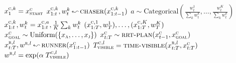 \documentclass{article}
\newcommand{\eval}{\,\reflectbox{$\leadsto$}\:}
\begin{document}
\begin{algorithm}[!t]
\begin{algorithmic}[1]
{}
    \State $x^{\textsc{c},k}_1 = x^\textsc{c}_\textsc{start}$
    \EndFor
    \State $x^{\textsc{c},k}_{1:t}, w^k_t \eval \textsc{chaser}(x^{\textsc{c},k}_{1:t-1})$ \EndFor
        \State $a \sim \text{Categorical}\left(\frac{w^1_t}{\sum_k w^k_t}, \dots, \frac{w^K_t}{\sum_k w^k_t} \right)$
        \State $x^{\textsc{c},k}_{1:t}, w^k_t = x^{\textsc{c},a}_{1:t}, \frac{1}{K} \sum_k w^k_t$
    \EndFor
    \EndFor
    \State \Return $(x^{\textsc{c},1}_{1:T}, w^1_T), \dots, (x^{\textsc{c},K}_{1:T}, w^K_T)$
\EndQuery
{}
    \State $x^\textsc{c}_\textsc{goal} \sim \text{Uniform}(\{x_\textsc{a},\ldots,x_\textsc{j}\})$
    \State $x^\textsc{c}_{t:T} \sim \Call{rrt-plan}{x^\textsc{c}_{t-1}, x^\textsc{c}_\textsc{goal}}$
      \State $x^{\textsc{r},l}_{t:T}, w^{\textsc{r},l} \eval \textsc{runner}(x^\textsc{c}_{1:t-1})$
      \State $T^{\textsc{c},l}_\textsc{visible} = \Call{time-visible}{x^{\textsc{r},l}_{t:T}, x^\textsc{c}_{t:T}}$
      \State $w^{\textsc{r},l} = \exp(\alpha \; T^{\textsc{c},l}_\textsc{visible})$
    \EndFor

\end{algorithmic}
\end{algorithm}
\end{document}
